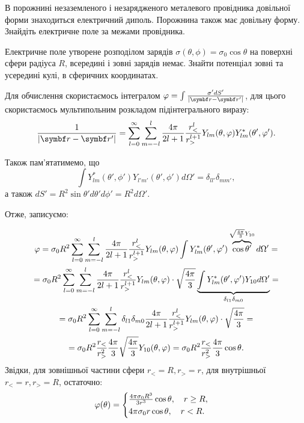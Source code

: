 \documentclass[]{ProblemBook}
\begin{document}
\begin{problem}
    В порожнині незаземленого і незарядженого металевого провідника довільної форми знаходиться електричний диполь. Порожнина також має довільну форму. Знайдіть електричне поле за межами провідника.
\end{problem}

\begin{problem}
Електричне поле утворене розподілом зарядів $\sigma(\theta, \phi) = \sigma_0\cos\theta$ на поверхні сфери радіуса $R$, всередині і зовні зарядів немає. Знайти потенціал зовні та усередині кулі, в сферичних координатах.
\begin{solution}

Для обчислення скористаємось інтегралом $\pot = \int\frac{\sigma'dS'}{|\vect{r} - \vect{r}'|}$, для цього скористаємось мультипольним розкладом підінтегрального виразу:
\[
    \frac{1}{|\vect{r} - \vect{r}'|} = \sum\limits_{l=0}^{\infty}\sum\limits_{m=-l}^l \frac{4\pi}{2l + 1} \frac{r_<^l}{r_>^{l+1}} Y_{lm}(\theta, \phi) Y_{lm}^*(\theta', \phi').
\]

Також пам'ятатимемо, що 
\[
    \int Y^*_{lm}(\theta', \phi')Y_{l'm'}(\theta', \phi')d\Omega' = \delta_{ll'}\delta_{mm'},
\]
а також $dS' = R^2\sin\theta'd\theta'd\phi' = R^2d\Omega'$.

Отже, записуємо:

\begin{multline}
    \pot = \sigma_0R^2  \sum\limits_{l=0}^{\infty}\sum\limits_{m=-l}^l \frac{4\pi}{2l + 1} \frac{r_<^l}{r_>^{l+1}} Y_{lm}(\theta, \phi) \int Y_{lm}^*(\theta', \phi') \overbrace{\cos\theta'}^{\sqrt{\frac{4\pi}{3}}Y_{10}} d\Omega' = \\
   = \sigma_0R^2  \sum\limits_{l=0}^{\infty}\sum\limits_{m=-l}^l \frac{4\pi}{2l + 1} \frac{r_<^l}{r_>^{l+1}} Y_{lm}(\theta, \phi) \cdot \sqrt{\frac{4\pi}{3}} \underbrace{\int Y_{lm}^*(\theta', \phi')  Y_{10} d\Omega'}_{\delta_{l1}\delta_{m0}} = \\
      = \sigma_0R^2  \sum\limits_{l=0}^{\infty}\sum\limits_{m=-l}^l \delta_{l1}\delta_{m0} \frac{4\pi}{2l + 1} \frac{r_<^l}{r_>^{l+1}} Y_{lm}(\theta, \phi) \cdot \sqrt{\frac{4\pi}{3}} = \\
       =  \sigma_0R^2 \frac{r_<}{r_>^2}  \frac{4\pi}{3} \sqrt{\frac{4\pi}{3}} Y_{10}(\theta, \phi) = \sigma_0R^2 \frac{r_<}{r_>^2}  \frac{4\pi}{3} \cos\theta.
\end{multline}
Звідки, для зовнішньої частини сфери $r_< = R, r_> = r$, для внутрішньої $r_< = r, r_> = R$, остаточно:
\[
    \pot(\theta) = 
\begin{cases}
     \frac{4\pi\sigma_0 R^3}{3r^3}\cos\theta, \quad r \ge R, \\
    4\pi\sigma_0 r \cos\theta, \quad r < R.
\end{cases}
\]

\end{solution}
\end{problem}
\end{document}

